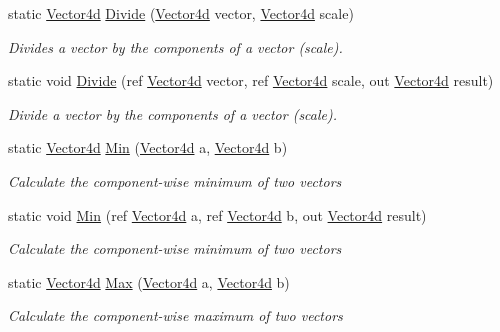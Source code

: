 \begin{DoxyCompactItemize}
static \hyperlink{struct_open_t_k_1_1_vector4d}{Vector4d} \hyperlink{struct_open_t_k_1_1_vector4d_ac31695d22b0c7d57e2090d1f580ec2e7}{Divide} (\hyperlink{struct_open_t_k_1_1_vector4d}{Vector4d} vector, \hyperlink{struct_open_t_k_1_1_vector4d}{Vector4d} scale)
\begin{DoxyCompactList}\small\item\em Divides a vector by the components of a vector (scale). \end{DoxyCompactList}\item 
static void \hyperlink{struct_open_t_k_1_1_vector4d_a88e149eca193d3394bec02ac4b8e8338}{Divide} (ref \hyperlink{struct_open_t_k_1_1_vector4d}{Vector4d} vector, ref \hyperlink{struct_open_t_k_1_1_vector4d}{Vector4d} scale, out \hyperlink{struct_open_t_k_1_1_vector4d}{Vector4d} result)
\begin{DoxyCompactList}\small\item\em Divide a vector by the components of a vector (scale). \end{DoxyCompactList}\item 
static \hyperlink{struct_open_t_k_1_1_vector4d}{Vector4d} \hyperlink{struct_open_t_k_1_1_vector4d_acd7c291eff9637ca79eeab635151e146}{Min} (\hyperlink{struct_open_t_k_1_1_vector4d}{Vector4d} a, \hyperlink{struct_open_t_k_1_1_vector4d}{Vector4d} b)
\begin{DoxyCompactList}\small\item\em Calculate the component-\/wise minimum of two vectors \end{DoxyCompactList}\item 
static void \hyperlink{struct_open_t_k_1_1_vector4d_ae2bfaccd45d021e46725a9620e07f965}{Min} (ref \hyperlink{struct_open_t_k_1_1_vector4d}{Vector4d} a, ref \hyperlink{struct_open_t_k_1_1_vector4d}{Vector4d} b, out \hyperlink{struct_open_t_k_1_1_vector4d}{Vector4d} result)
\begin{DoxyCompactList}\small\item\em Calculate the component-\/wise minimum of two vectors \end{DoxyCompactList}\item 
static \hyperlink{struct_open_t_k_1_1_vector4d}{Vector4d} \hyperlink{struct_open_t_k_1_1_vector4d_a09291ce15a9b58c46a114294c8a8b36e}{Max} (\hyperlink{struct_open_t_k_1_1_vector4d}{Vector4d} a, \hyperlink{struct_open_t_k_1_1_vector4d}{Vector4d} b)
\begin{DoxyCompactList}\small\item\em Calculate the component-\/wise maximum of two vectors \end{DoxyCompactList}\item 

\end{DoxyCompactItemize}
